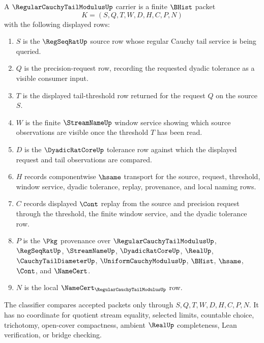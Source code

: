 \begin{definition}
\label{def:regular-cauchy-tail-modulus-carrier}
A $\RegularCauchyTailModulusUp$ carrier is a finite $\BHist$ packet
$$
K=(S,Q,T,W,D,H,C,P,N)
$$
with the following displayed rows:
\begin{enumerate}
\item $S$ is the $\RegSeqRatUp$ source row whose regular Cauchy tail service is being queried.
\item $Q$ is the precision-request row, recording the requested dyadic tolerance as a visible consumer input.
\item $T$ is the displayed tail-threshold row returned for the request $Q$ on the source $S$.
\item $W$ is the finite $\StreamNameUp$ window service showing which source observations are visible once the threshold $T$ has been read.
\item $D$ is the $\DyadicRatCoreUp$ tolerance row against which the displayed request and tail observations are compared.
\item $H$ records componentwise $\hsame$ transport for the source, request, threshold, window service, dyadic tolerance, replay, provenance, and local naming rows.
\item $C$ records displayed $\Cont$ replay from the source and precision request through the threshold, the finite window service, and the dyadic tolerance row.
\item $P$ is the $\Pkg$ provenance over $\RegularCauchyTailModulusUp$, $\RegSeqRatUp$, $\StreamNameUp$, $\DyadicRatCoreUp$, $\RealUp$, $\CauchyTailDiameterUp$, $\UniformCauchyModulusUp$, $\BHist$, $\hsame$, $\Cont$, and $\NameCert$.
\item $N$ is the local $\NameCert_{\RegularCauchyTailModulusUp}$ row.
\end{enumerate}
The classifier compares accepted packets only through $S,Q,T,W,D,H,C,P,N$. It has no coordinate for quotient stream equality, selected limits, countable choice, trichotomy, open-cover compactness, ambient $\RealUp$ completeness, Lean verification, or bridge checking.
\end{definition}

